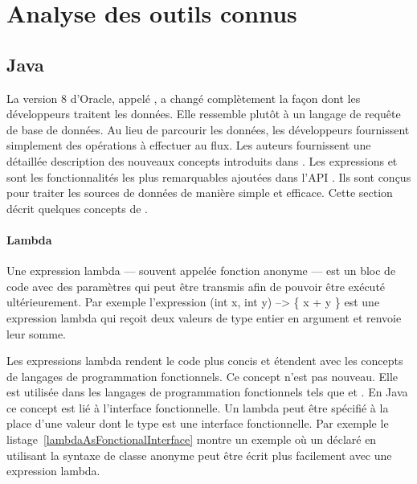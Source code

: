 
\chapter{Analyse des outils connus}
\label{outils_connus}

\section{Java}

La version 8 d'Oracle, appel\'e , a chang\'e compl\`etement la façon dont les d\'eveloppeurs traitent les donn\'ees. Elle ressemble plut\^ot \`a un langage de requ\^ete de base de donn\'ees. Au lieu de parcourir les donn\'ees, les d\'eveloppeurs fournissent simplement des op\'erations \`a effectuer au flux. Les auteurs \cite{urma2014java} fournissent une d\'etaill\'ee description des nouveaux concepts introduits dans . Les expressions  et  sont les fonctionnalit\'es les plus remarquables ajout\'ees dans l'API \cite{javaStreamAPI}. Ils sont con\c{c}us pour traiter les sources de donn\'ees de mani\`ere simple et efficace. Cette section d\'ecrit quelques concepts de .


\subsubsection{Lambda}

Une expression lambda --- souvent appel\'ee fonction anonyme --- est un bloc de code avec des param\`etres qui peut \^etre transmis afin de pouvoir \^etre ex\'ecut\'e ult\'erieurement. Par exemple l'expression (int x, int y) –> \{ x + y \} est une expression lambda qui re\c{c}oit deux valeurs de type entier en argument et renvoie leur somme.

Les expressions lambda rendent le code plus concis et \'etendent  avec les concepts de langages de programmation fonctionnels. Ce concept n'est pas nouveau. Elle est utilis\'ee dans les langages de programmation fonctionnels tels que  \cite{hutton2016programming} et  \cite{steele1990common}. En Java ce concept est li\'e \`a l'interface fonctionnelle. Un lambda peut \^etre sp\'ecifi\'e \`a la place d'une valeur dont le type est une interface fonctionnelle. Par exemple le listage~\ref{lambdaAsFonctionalInterface} montre un exemple o\`u un  d\'eclar\'e en utilisant la syntaxe de classe anonyme peut \^etre \'ecrit plus facilement avec une expression lambda.

